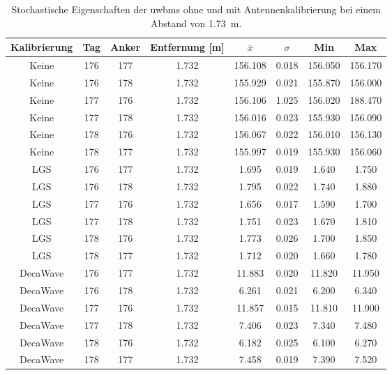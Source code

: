 \begin{table}[h]
	\centering
	\begin{tabular}{||c||cc||ccc|cc||}
\hline
Kalibrierung & Tag & Anker & Entfernung [\si{\meter}] & $\overline{x}$ & $\sigma$ & Min & Max \\
\hline
\hline
Keine & 176 & 177 & \num{1.732} & \num{156.108} & \num{0.018} & \num{156.050} & \num{156.170} \\
Keine & 176 & 178 & \num{1.732} & \num{155.929} & \num{0.021} & \num{155.870} & \num{156.000} \\
Keine & 177 & 176 & \num{1.732} & \num{156.106} & \num{1.025} & \num{156.020} & \num{188.470} \\
Keine & 177 & 178 & \num{1.732} & \num{156.016} & \num{0.023} & \num{155.930} & \num{156.090} \\
Keine & 178 & 176 & \num{1.732} & \num{156.067} & \num{0.022} & \num{156.010} & \num{156.130} \\
Keine & 178 & 177 & \num{1.732} & \num{155.997} & \num{0.019} & \num{155.930} & \num{156.060} \\
\hline
LGS & 176 & 177 & \num{1.732} & \num{1.695} & \num{0.019} & \num{1.640} & \num{1.750} \\
LGS & 176 & 178 & \num{1.732} & \num{1.795} & \num{0.022} & \num{1.740} & \num{1.880} \\
LGS & 177 & 176 & \num{1.732} & \num{1.656} & \num{0.017} & \num{1.590} & \num{1.700} \\
LGS & 177 & 178 & \num{1.732} & \num{1.751} & \num{0.023} & \num{1.670} & \num{1.810} \\
LGS & 178 & 176 & \num{1.732} & \num{1.773} & \num{0.026} & \num{1.700} & \num{1.850} \\
LGS & 178 & 177 & \num{1.732} & \num{1.712} & \num{0.020} & \num{1.660} & \num{1.780} \\
\hline
DecaWave & 176 & 177 & \num{1.732} & \num{11.883} & \num{0.020} & \num{11.820} & \num{11.950} \\
DecaWave & 176 & 178 & \num{1.732} & \num{6.261} & \num{0.021} & \num{6.200} & \num{6.340} \\
DecaWave & 177 & 176 & \num{1.732} & \num{11.857} & \num{0.015} & \num{11.810} & \num{11.900} \\
DecaWave & 177 & 178 & \num{1.732} & \num{7.406} & \num{0.023} & \num{7.340} & \num{7.480} \\
DecaWave & 178 & 176 & \num{1.732} & \num{6.182} & \num{0.025} & \num{6.100} & \num{6.270} \\
DecaWave & 178 & 177 & \num{1.732} & \num{7.458} & \num{0.019} & \num{7.390} & \num{7.520} \\
\hline
	\end{tabular}
	\caption{Stochastische Eigenschaften der \Glspl{uwbm} ohne und mit Antennenkalibrierung bei einem Abstand von \SI{1.73}{\meter}.}
	\label{tab:calibration_range_results}
\end{table}


